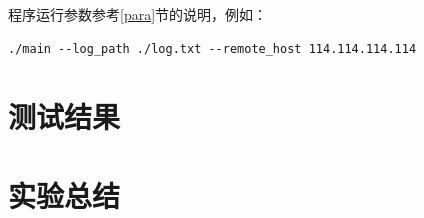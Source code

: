 \documentclass[lang=cn,11pt,a4paper,cite=authornum]{paper}
\begin{document}
程序运行参数参考\ref{para}节的说明，例如：

\begin{code}
\begin{verbatim}
./main --log_path ./log.txt --remote_host 114.114.114.114
\end{verbatim}
\end{code}

\section{测试结果}

\section{实验总结}


    
    

\end{document}
